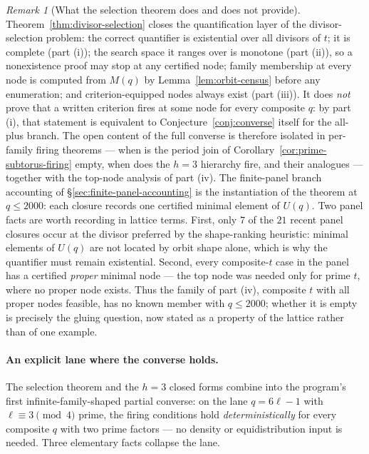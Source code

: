 \documentclass[11pt]{article}
\theoremstyle{plain}
\theoremstyle{definition}
\theoremstyle{remark}
\newtheorem{remark}[theorem]{Remark}
\begin{document}
\begin{remark}[What the selection theorem does and does not provide]
\label{rem:selection-open}
Theorem~\ref{thm:divisor-selection} closes the quantification layer of the
divisor-selection problem: the correct quantifier is existential over all
divisors of $t$; it is complete (part (i)); the search space it ranges over
is monotone (part (ii)), so a nonexistence proof may stop at any certified
node; family membership at every node is computed from $M(q)$ by
Lemma~\ref{lem:orbit-census} before any enumeration; and criterion-equipped
nodes always exist (part (iii)).  It does \emph{not} prove that a written
criterion fires at some node for every composite $q$: by part (i), that
statement is equivalent to Conjecture~\ref{conj:converse} itself for the
all-plus branch.  The open content of the full converse is therefore
isolated in per-family firing theorems --- when is the period join of
Corollary~\ref{cor:prime-subtorus-firing} empty, when does the $h=3$
hierarchy fire, and their analogues --- together with the top-node analysis
of part (iv).  The finite-panel branch accounting of
\S\ref{sec:finite-panel-accounting} is the instantiation of the theorem at
$q\le2000$: each closure records one certified minimal element of $U(q)$.
Two panel facts are worth recording in lattice terms.  First, only $7$ of
the $21$ recent panel closures occur at the divisor preferred by the
shape-ranking heuristic: minimal elements of $U(q)$ are not located by
orbit shape alone, which is why the quantifier must remain existential.
Second, every composite-$t$ case in the panel has a certified \emph{proper}
minimal node --- the top node was needed only for prime $t$, where no proper
node exists.  Thus the family of part (iv), composite $t$ with all proper
nodes feasible, has no known member with $q\le2000$; whether it is empty is
precisely the gluing question, now stated as a property of the lattice
rather than of one example.
\end{remark}

\paragraph{An explicit lane where the converse holds.}
The selection theorem and the $h=3$ closed forms combine into the
program's first infinite-family-shaped partial converse: on the lane
$q=6\ell-1$ with $\ell\equiv3\pmod4$ prime, the firing conditions hold
\emph{deterministically} for every composite $q$ with two prime
factors --- no density or equidistribution input is needed.  Three
elementary facts collapse the lane.
\end{document}
